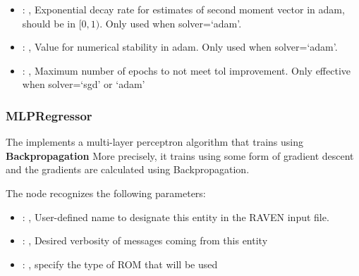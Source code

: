 \begin{itemize}
    \item {}: , 
      Exponential decay rate for estimates of second moment vector in adam, should be in $[0, 1)$.
      Only used when solver=`adam'.

    \item {}: , 
      Value for numerical stability in adam. Only used when solver=`adam'.

    \item {}: , 
      Maximum number of epochs to not meet tol improvement. Only effective when
      solver=`sgd' or `adam'
  \end{itemize}


\subsubsection{MLPRegressor}
  The  implements a multi-layer perceptron algorithm that trains using
  \textbf{Backpropagation}                             More precisely, it trains using some form of
  gradient descent and the gradients are calculated using Backpropagation.

  The  node recognizes the following parameters:
    \begin{itemize}
      \item {}: , 
        User-defined name to designate this entity in the RAVEN input file.
      \item {}: , 
        Desired verbosity of messages coming from this entity
      \item {}: , 
        specify the type of ROM that will be used
  \end{itemize}

